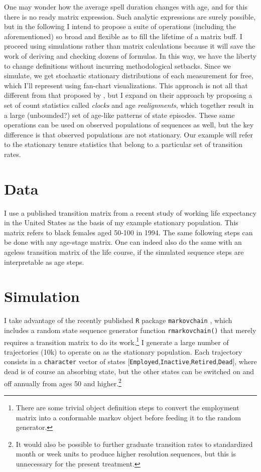 \documentclass{article}
\begin{document}
One may wonder how the average spell duration changes with age, and for this
there is no ready matrix expression. Such analytic expressions are surely
possible, but in the following I intend to propose a suite of operations
(including the aforementioned) so broad and flexible as to fill the lifetime of
a matrix buff.
I proceed using simulations rather than matrix calculations because it will
save the work of deriving and checking dozens of formulas. In this way, we have
the liberty to change definitions without incurring methodological setbacks.
Since we simulate, we get stochastic stationary distributions of each
measurement for free, which I'll represent using fan-chart visualizations. This
approach is not all that different from that proposed by \citet{laditka1998new},
but I expand on their approach by
proposing a set of count statistics called \emph{clocks} and age
\emph{realignments}, which together result in a large (unbounded?) set of
age-like patterns of state episodes. These same operations can be used
on observed populations of sequences as well, but the key difference
is that observed populations are not stationary. Our example will refer to the
stationary tenure statistics that belong to a particular set of transition
rates.

\section{Data}
I use a published transition matrix from a recent
study of working life expectancy in the United States \citep{Dudel2017} as the
basis of my example stationary population.
This matrix refers to black females aged 50-100 in 1994. The same following
steps can be done with any age-stage matrix. One can indeed also do the same with
an ageless transition matrix of the life course, if the simulated sequence steps
are interpretable as age steps.

\section{Simulation}
I take advantage of the recently published \texttt{R} package
\texttt{markovchain} \citep{spedicato2017}, which includes a random state
sequence generator function \texttt{rmarkovchain()} that merely requires a
transition matrix to do its work.\footnote{There are some trivial object
definition steps to convert the employment matrix into a conformable markov
object before feeding it to the random generator.} I generate a large number of
trajectories (10k) to operate on as the stationary population. Each
trajectory consists in a \texttt{character} vector of states
[\texttt{Employed},\texttt{Inactive},\texttt{Retired},\texttt{Dead}], where dead
is of course an absorbing state, but the other states can be switched on and off
annually from ages 50 and higher.\footnote{It would also be possible to further
graduate transition rates to standardized month or week units to produce higher
resolution sequences, but this is unnecessary for the present treatment.}
\end{document}
